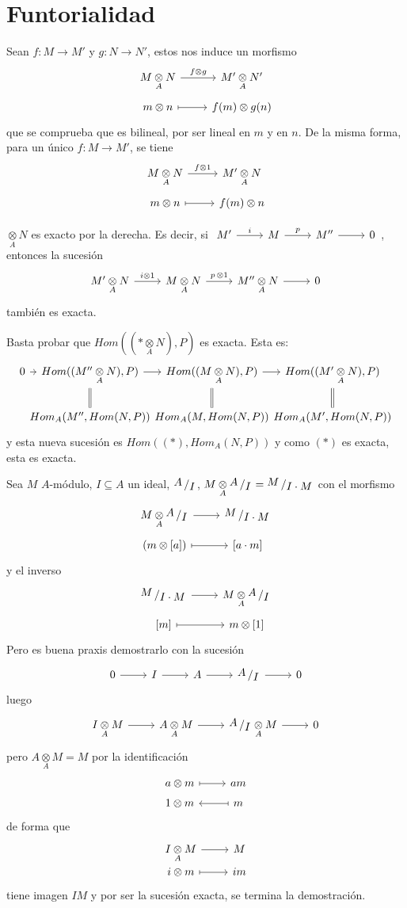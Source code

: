 \section{Funtorialidad}
Sean $f: M \longrightarrow M'$ y $g:N \longrightarrow N'$, estos nos induce un morfismo
$$\bt M \underset{A}{\otimes} N \arrow{r}{f\otimes g} & M' \underset{A}{\otimes} N' \\[-5mm] m \otimes n \arrow[mapsto]{r} & f(m)\otimes g(n) \et$$
que se comprueba que es bilineal, por ser lineal en $m$ y en $n$. De la misma forma, para un \'unico $f:M \longrightarrow M'$, se tiene
$$\bt M \underset{A}{\otimes} N \arrow{r}{f\otimes 1} & M' \underset{A}{\otimes} N \\[-5mm] m \otimes n \arrow[mapsto]{r} & f(m)\otimes n \et$$
\begin{prop}
    $\underset{A}{\otimes} N$ es exacto por la derecha. Es decir, si $\bt M' \arrow{r}{i} & M \arrow{r}{p} & \arrow{r} M'' & 0 \et$, entonces la sucesi\'on
    $$\bt M' \underset{A}{\otimes} N\arrow{r}{i\otimes 1} & M\underset{A}{\otimes} N \arrow{r}{p\, \otimes 1} & \arrow{r} M''\underset{A}{\otimes} N & 0 \et$$
    tambi\'en es exacta. 
\end{prop}
\begin{dem}
    Basta probar que $Hom((*\underset{A}{\otimes}N), P)$ es exacta. Esta es:
    $$ \bt 0 \arrow{r} &[-10mm] Hom((M''\underset{A}{\otimes}N),P) \arrow[equal]{d} \arrow{r} &[-10mm] Hom((M\underset{A}{\otimes}N),P) \arrow{r} \arrow[equal]{d} &[-10mm]  Hom((M'\underset{A}{\otimes}N), P) \arrow[equal]{d} \\ &[-10mm]  Hom_A(M'', Hom(N,P)) &[-10mm]  Hom_A(M, Hom(N,P)) &[-10mm]  Hom_A(M', Hom(N,P)) \et$$
    y esta nueva sucesi\'on es $Hom((*), Hom_A(N,P))$ y como $(*)$ es exacta, esta es exacta. 
\end{dem}
\begin{cor}
    Sea $M$ $A$-m\'odulo, $I \subseteq A$ un ideal, $\modulo{A}{I}$, $M \underset{A}{\otimes} \modulo{A}{I} = \modulo{M}{I \cdot M}$
    con el morfismo
    $$\bt  M \underset{A}{\otimes} \modulo{A}{I} \arrow{r} & \modulo{M}{I \cdot M} \\[-5mm] (m \otimes [a]) \arrow[mapsto]{r} & \left[a \cdot  m\right] \et$$
    y el inverso
     $$\bt \modulo{M}{I \cdot M} \arrow{r} &  M \underset{A}{\otimes} \modulo{A}{I} \\[-5mm] \left[m\right] \arrow[mapsto]{r} & m  \otimes \left[1 \right] \et$$
     Pero es buena praxis demostrarlo con la sucesi\'on
     $$\bt 0 \arrow{r} & I \arrow{r} &  A \arrow{r} & \modulo{A}{I} \arrow{r} & 0 \et$$
     luego 
    $$\bt I \underset{A}{\otimes} M \arrow{r} & A \underset{A}{\otimes} M \arrow{r} & \modulo{A}{I} \underset{A}{\otimes} M \arrow{r} & 0 \et$$
pero $ A \underset{A}{\otimes} M = M$ por la identificaci\'on 
$$\bt a\otimes m \arrow[mapsto]{r} & am \\[-5mm] 1 \otimes m & \arrow[mapsto]{l} m \et$$
de forma que $$\bt I \underset{A}{\otimes} M \arrow{r} & M \\[-7mm] i \otimes m \arrow[mapsto]{r} & im \et$$
tiene imagen $IM$ y por ser la sucesi\'on exacta, se termina la demostraci\'on.
\end{cor}

